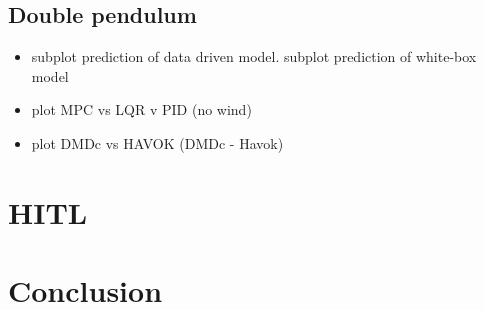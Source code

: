         \FloatBarrier\subsection{Double pendulum}

            \begin{itemize}
                \item subplot prediction of data driven model. subplot prediction of white-box model
                \item plot \gls{MPC} vs \gls{LQR} v \gls{PID} (no wind)
                \item plot \gls{DMDc} vs \gls{HAVOK} (\gls{DMDc} - Havok)
            \end{itemize}

    \section{HITL}

    \section{Conclusion}


